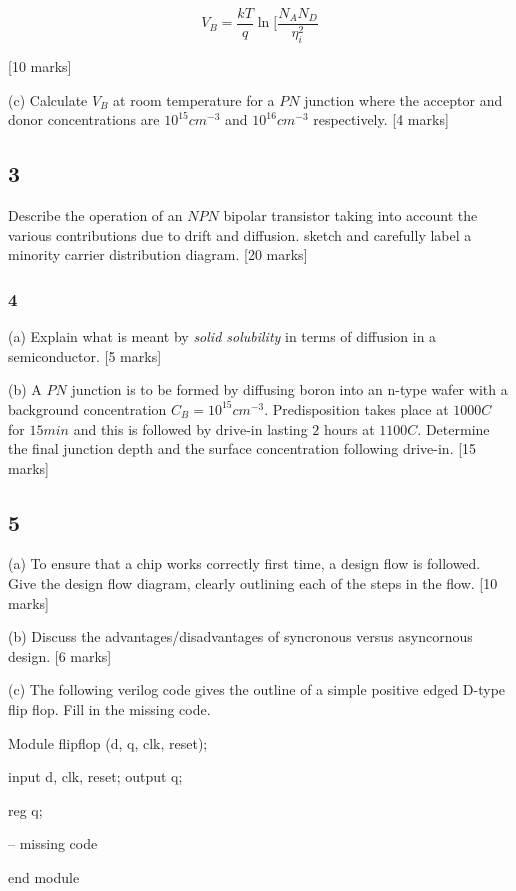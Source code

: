 \documentclass[a4paper,12pt]{article}
\begin{document}
\[ V_{B} = \frac{kT}{q} \ln[\frac{N_{A} N_{D}}{\eta_{i}^{2}} \]

[10 marks]

(c) Calculate $V_{B}$ at room temperature for a $PN$ junction where the
acceptor and donor concentrations are $10^{15} cm^{-3}$ and $10^{16}
cm^{-3}$ respectively. [4 marks]

\subsection*{3}

Describe the operation of an $NPN$ bipolar transistor taking into
account the various contributions due to drift and diffusion. sketch and
carefully label a minority carrier distribution diagram. [20 marks]

\subsubsection*{4}

(a) Explain what is meant by \emph{solid solubility} in terms of diffusion
in a semiconductor. [5 marks]


(b) A $PN$ junction is to be formed by diffusing boron into an n-type wafer
with a background concentration $C_{B} = 10^{15} cm^{-3}$.
Predisposition takes place at $1000C$ for $15 min$ and this is followed
by drive-in lasting $2$ hours at $1100C$. Determine the final junction
depth and the surface concentration following drive-in. [15 marks]

\subsection*{5}

(a) To ensure that a chip works correctly first time, a design flow is
followed. Give the design flow diagram, clearly outlining each of the
steps in the flow. [10 marks]


(b) Discuss the advantages/disadvantages of syncronous versus asyncornous
design. [6 marks]


(c) The following verilog code gives the outline of a simple positive edged
D-type flip flop. Fill in the missing code.


Module flipflop (d, q, clk, reset);


	input d, clk, reset;
	output q;

	reg q;

	-- missing code

end module
\end{document}
